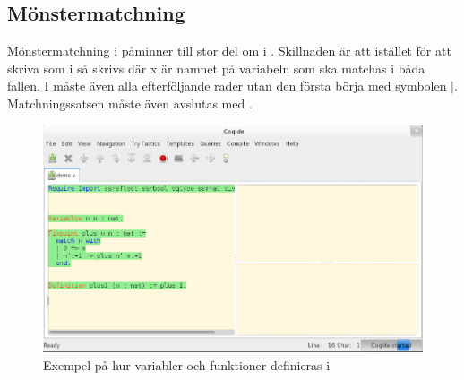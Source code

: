 \subsection{Mönstermatchning}
Mönstermatchning i \coq{} påminner till stor del om  i \haskell{}.
Skillnaden är att istället för att skriva  som i \haskell{} så skrivs
 där x är namnet på variabeln som ska matchas i båda fallen.
I \coq{} måste även alla efterföljande rader utan den första börja med symbolen
$|$. Matchningssatsen måste även avslutas med .

\begin{figure}[H]
  \centering
  \includegraphics[width=150mm]{images/Variables_and_Functions}
  \caption[Variabler och funktioner]
   {Exempel på hur variabler och funktioner definieras i \coq{}}
\end{figure}

